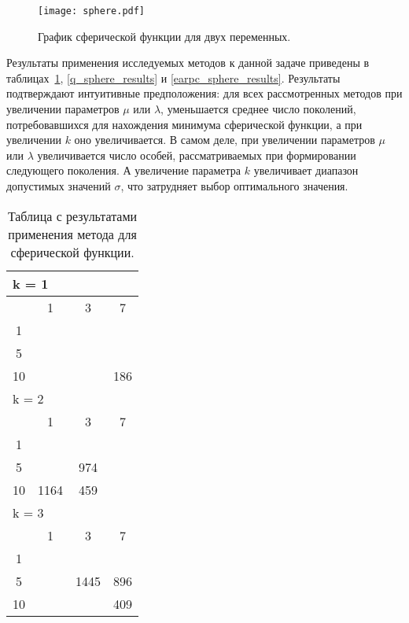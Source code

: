 \begin{figure}
    \centering
    \texttt{[image: sphere.pdf]}
    \caption{График сферической функции для двух переменных.}
    \label{sphere_plot}
\end{figure}

Результаты применения исследуемых методов к данной задаче приведены в таблицах~\ref{adaptive_sphere_results}, \ref{q_sphere_results} и \ref{earpc_sphere_results}. Результаты подтверждают интуитивные предположения: для всех рассмотренных методов при увеличении параметров $\mu$ или $\lambda$, уменьшается среднее число поколений, потребовавшихся для нахождения минимума сферической функции, а при увеличении $k$ оно увеличивается. В самом деле, при увеличении параметров $\mu$ или $\lambda$ увеличивается число особей, рассматриваемых при формировании следующего поколения. А увеличение параметра $k$ увеличивает диапазон допустимых значений $\sigma$, что затрудняет выбор оптимального значения.

\begin{table}
  \centering
    \begin{tabular}{|*4{c|}}
    \hline
    \multicolumn{4}{|l|}{k = 1} \\
    \hline
    \diagbox{$\mu$}{$\lambda$} & \multicolumn{1}{c|}{1} & \multicolumn{1}{c|}{3} & \multicolumn{1}{c|}{7} \\
    \hline
    1 & \cellcolor{olive}{2434} & \cellcolor{olive}{2207}& \cellcolor{olive}{878} \\
    \hline
    5 & \cellcolor{olive}{1450} & \cellcolor{olive}{569} & \cellcolor{olive}{368} \\
    \hline
    10 & \cellcolor{olive}{703} & \cellcolor{olive}{331} & 186 \\
    \hline
    \multicolumn{4}{|l|}{k = 2} \\
    \hline
    \diagbox{$\mu$}{$\lambda$} & \multicolumn{1}{c|}{1} & \multicolumn{1}{c|}{3} & \multicolumn{1}{c|}{7} \\
    \hline
    1 & \cellcolor{olive}{4342}& \cellcolor{olive}{2333}& \cellcolor{olive}{1464} \\
    \hline
    5 & \cellcolor{olive}{1891} & 974& \cellcolor{olive}{616} \\
    \hline
    10 & 1164 & 459& \cellcolor{olive}{188} \\
    \hline
    \multicolumn{4}{|l|}{k = 3} \\
    \hline
    \diagbox{$\mu$}{$\lambda$} & \multicolumn{1}{c|}{1} & \multicolumn{1}{c|}{3} & \multicolumn{1}{c|}{7} \\
    \hline
    1 & \cellcolor{olive}{8055}& \cellcolor{olive}{2826}& \cellcolor{olive}{1427} \\
    \hline
    5 & \cellcolor{olive}{2447} & 1445 & 896 \\
    \hline
    10 & \cellcolor{olive}{1996}& \cellcolor{olive}{1053} & 409 \\
  \hline
  \end{tabular}
  \captionsetup{justification=centering}
  \caption{Таблица с результатами применения метода  для сферической функции.}
  \label{adaptive_sphere_results}
\end{table}

